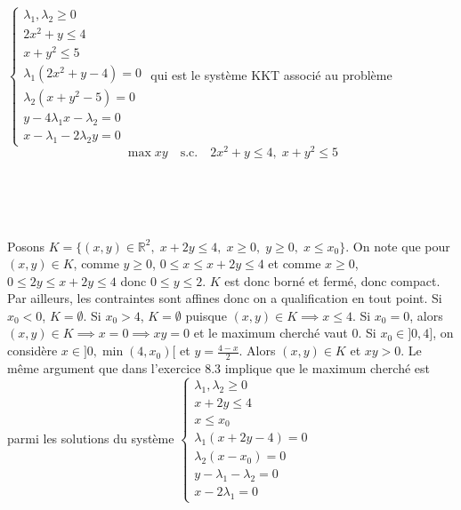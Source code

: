 \documentclass{report}
\begin{document}
$\begin{cases}
\lambda_1,\lambda_2\geq 0 \\
2x^2+y\leq 4 \\
x+y^2\leq 5 \\
\lambda_1 (2x^2+y -4)=0 \\
\lambda_2 (x+y^2- 5)=0 \\
y-4\lambda_1 x - \lambda_2  = 0 \\
x - \lambda_1 - 2 \lambda_2 y = 0
\end{cases}$\newline \newline
qui est le système KKT associé au problème $$\max xy \quad \text{s.c.} \quad 2x^2+y\leq 4, \; x+y^2\leq 5$$

\subsection{} \noindent{}\\ 
\\ 
\\
\noindent Posons $K=\{(x,y)\in \mathbb R^2,\; x+2y\leq 4,\; x\geq 0,\; y\geq 0,\; x\leq x_0\}$.\newline
On note que pour $(x,y)\in K$, comme $y\geq 0$, $0\leq x\leq x+2y \leq 4$ et comme $x\geq 0$, $0\leq 2y \leq x+2y \leq 4$ donc $0\leq y \leq 2$. $K$ est donc borné et fermé, donc compact. \newline
Par ailleurs, les contraintes sont affines donc on a qualification en tout point.\newline
\newline 
Si $x_0<0$, $K=\emptyset$.\newline
Si $x_0>4$, $K=\emptyset$ puisque $(x,y)\in K \implies x\leq 4$. \newline
Si $x_0=0$, alors $(x,y)\in K \implies x=0 \implies xy=0$ et le maximum cherché vaut $0$.\newline
Si $x_0\in ]0,4]$, on considère $x\in ]0,\min(4,x_0)[$ et $y=\frac{4-x}{2}$. Alors $(x,y)\in K$ et $xy>0$. Le même argument que dans l'exercice 8.3 implique que le maximum cherché est parmi les solutions du système \newline
$\begin{cases}
\lambda_1, \lambda_2\geq 0 \\
x+2y\leq 4 \\
x\leq x_0 \\
\lambda_1(x+2y-4)=0 \\
\lambda_2 (x-x_0)=0 \\
y-\lambda_1-\lambda_2=0 \\
x-2\lambda_1=0
\end{cases}$ \newline
\end{document}
